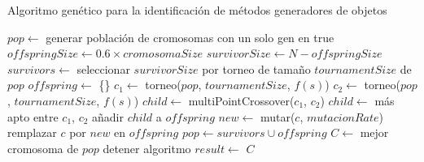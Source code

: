 \begin{algorithm}
  \caption{Algoritmo genético para la identificación de métodos generadores de
  objetos}
  \label{alg:enfoqueGA}
  \begin{algorithmic}[1]
  \STATE $pop \gets$ generar población de cromosomas con un solo gen en true
  \STATE $offspringSize \gets 0.6 \times cromosomaSize$
  \STATE $survivorSize \gets N - offspringSize$
      \STATE $survivors \gets$ seleccionar $survivorSize$ por torneo de tamaño $tournamentSize$ de $pop$
      \STATE $offspring \gets$ \{\}
          \STATE $c_1 \gets$ torneo($pop$, $tournamentSize$, $f(s)$)
          \STATE $c_2 \gets$ torneo($pop$, $tournamentSize$, $f(s)$)
            \STATE $child \gets$ multiPointCrossover($c_1$, $c_2$)
          \ELSE
            \STATE $child \gets$ más apto entre $c_1$, $c_2$
          \ENDIF
          \STATE añadir $child$ a $offspring$
      \ENDFOR
          \STATE $new \gets$ mutar($c$, $mutacionRate$)
            \STATE remplazar $c$ por $new$ en $offspring$
          \ENDIF
      \ENDFOR
    \STATE $pop \gets survivors \cup offspring$
    \STATE $C \gets$ mejor cromosoma de $pop$
        \STATE detener algoritmo
    \ENDIF
  \ENDFOR
\STATE $result \gets$ $C$


\end{algorithmic}
\end{algorithm}


  
  


